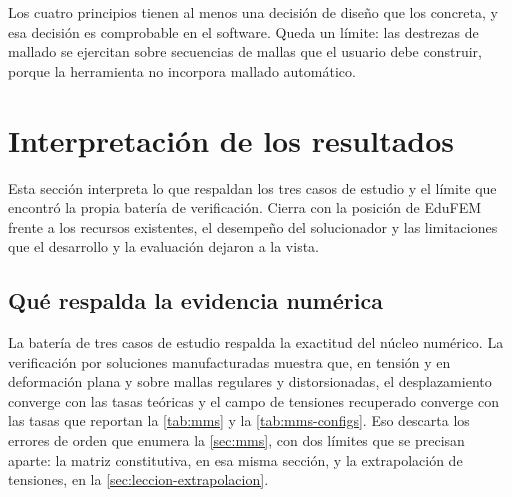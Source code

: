 Los cuatro principios tienen al menos una decisión de diseño que los concreta, y esa decisión es comprobable en el software. Queda un límite: las destrezas de mallado se ejercitan sobre secuencias de mallas que el usuario debe construir, porque la herramienta no incorpora mallado automático.

\section{Interpretación de los resultados}
\label{sec:interpretacion}

Esta sección interpreta lo que respaldan los tres casos de estudio y el límite que encontró la propia batería de verificación. Cierra con la posición de EduFEM frente a los recursos existentes, el desempeño del solucionador y las limitaciones que el desarrollo y la evaluación dejaron a la vista.

\subsection{Qué respalda la evidencia numérica}

La batería de tres casos de estudio respalda la exactitud del núcleo numérico. La verificación por soluciones manufacturadas muestra que, en tensión y en deformación plana y sobre mallas regulares y distorsionadas, el desplazamiento converge con las tasas teóricas y el campo de tensiones recuperado converge con las tasas que reportan la \autoref{tab:mms} y la \autoref{tab:mms-configs}. Eso descarta los errores de orden que enumera la \autoref{sec:mms}, con dos límites que se precisan aparte: la matriz constitutiva, en esa misma sección, y la extrapolación de tensiones, en la \autoref{sec:leccion-extrapolacion}.

